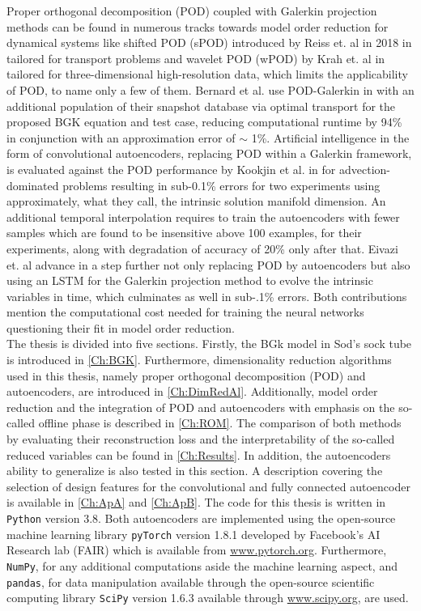 Proper orthogonal decomposition (POD) coupled with Galerkin projection methods can be found in numerous tracks towards model order reduction for dynamical systems like shifted POD (sPOD) introduced by Reiss et. al in 2018 in \cite{reiss2018shifted} tailored for transport problems and wavelet POD (wPOD) by Krah et. al in \cite{krah2020wavelet}  tailored for three-dimensional high-resolution data, which limits the applicability of POD, to name only a few of them. Bernard et al. use POD-Galerkin in \cite{Bernard} with an additional population of their snapshot database via optimal transport for the proposed BGK equation and test case, reducing computational runtime by 94\% in conjunction with an approximation error of \(\sim\) 1\%. Artificial intelligence in the form of convolutional autoencoders, replacing POD within a Galerkin framework, is evaluated against the POD performance by Kookjin et al. in \cite{Carlberg} for advection-dominated problems resulting in sub-0.1\% errors for two experiments using approximately, what they call, the intrinsic solution manifold dimension. An additional temporal interpolation requires to train the autoencoders with fewer samples which are found to be insensitive above 100 examples, for their experiments, along with degradation of accuracy of 20\% only after that. Eivazi et. al advance in \cite{eivazi2021recurrent} a step further not only replacing POD by autoencoders but also using an LSTM for the Galerkin projection method to evolve the intrinsic variables in time, which culminates as well in sub-.1\% errors. Both contributions mention the computational cost needed for training the neural networks questioning their fit in model order reduction.\\ 

The thesis is divided into five sections. Firstly, the BGk model in Sod's sock tube is introduced in \cref{Ch:BGK}. Furthermore, dimensionality reduction algorithms used in this thesis, namely proper orthogonal decomposition (POD) and autoencoders, are introduced in \cref{Ch:DimRedAl}. Additionally, model order reduction and the integration of POD and autoencoders with emphasis on the so-called offline phase is described in \cref{Ch:ROM}. The comparison of both methods by evaluating their reconstruction loss and the interpretability of the so-called reduced variables can be found in \cref{Ch:Results}. In addition, the autoencoders ability to generalize is also tested in this section. A description covering the selection of design features for the convolutional and fully connected autoencoder is available in \cref{Ch:ApA} and \cref{Ch:ApB}. The code for this thesis is written in \texttt{Python} version 3.8. Both autoencoders are implemented using the open-source machine learning library \texttt{pyTorch} version 1.8.1 developed by Facebook's AI Research lab (FAIR) which is available from \url{www.pytorch.org}. Furthermore, \texttt{NumPy}, for any additional computations aside the machine learning aspect, and \texttt{pandas}, for data manipulation available through the open-source scientific computing library \texttt{SciPy} version 1.6.3 available through \url{www.scipy.org}, are used.\\  
